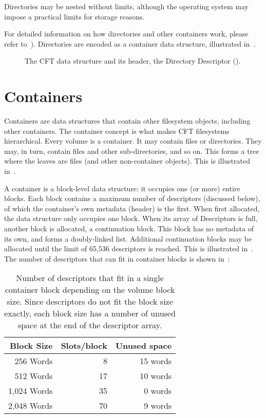 Directories may be nested without limits, although the operating system may
impose a practical limits for storage reasons.

For detailed information on how directories and other containers work, please
refer to~). Directories are encoded as a 
container data structure, illustrated in~.


\begin{figure}
 \centering
 \caption[CFT Directory data structure]{\label{fig:fs-directory} The
   CFT  data structure and its header, the Directory
   Descriptor ().}
\end{figure}





\section{Containers}
\label{sec:fs-containers}

Containers are data structures that contain other filesystem objects, including
other containers. The container concept is what makes CFT filesystems
hierarchical. Every \gls{volume} is a container. It may contain files or
directories. They may, in turn, contain files and other sub-directories, and so
on. This forms a tree where the leaves are files (and other non-container
objects). This is illustrated in~.

A container is a block-level data structure: it occupies one (or more) entire
blocks. Each block contains a maximum number of \glspl{descriptor} (discussed
below), of which the container's own metadata (header) is the first. When first
allocated, the data structure only occupies one block. When its array of
Descriptors is full, another block is allocated, a continuation block. This
block has no metadata of its own, and forms a doubly-linked list. Additional
continuation blocks may be allocated until the limit of 65,536 descriptors is
reached. This is illustrated in~. The number of
descriptors that can fit in container blocks is shown
in~:

\begin{table}[htb]
  \centering
  \zebra
  \begin{tabular}{rrr}
    Block Size & Slots/block & Unused space \\
    \hline
    256 Words   &  8 & 15 words\\
    512 Words   & 17 & 10 words\\
    1,024 Words & 35 &  0 words\\
    2,048 Words & 70 &  9 words\\
    \hline
  \end{tabular}
  \caption[Number of Descriptors by Block Size]{\label{table:fs-desc-bs} Number
    of descriptors that fit in a single container block depending on the volume
    block size. Since descriptors do not fit the block size exactly, each block
    size has a number of unused space at the end of the descriptor array.}
\end{table}

